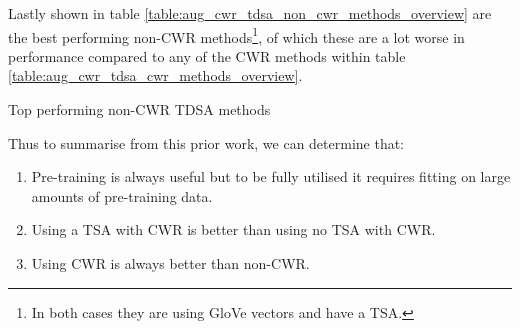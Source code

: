 Lastly shown in table \ref{table:aug_cwr_tdsa_non_cwr_methods_overview} are the best performing non-CWR methods\footnote{In both cases they are using GloVe vectors and have a TSA.}, of which these are a lot worse in performance compared to any of the CWR methods within table \ref{table:aug_cwr_tdsa_cwr_methods_overview}.

\begin{landscape}%
        
\end{landscape}

\begin{table}[!h]
    \centering
    
    \caption{Top performing non-CWR TDSA methods}
    \label{table:aug_cwr_tdsa_non_cwr_methods_overview}
\end{table}

Thus to summarise from this prior work, we can determine that:
\begin{enumerate}
    \item Pre-training is always useful but to be fully utilised it requires fitting on large amounts of pre-training data.
    \item Using a TSA with CWR is better than using no TSA with CWR.
    \item Using CWR is always better than non-CWR.
\end{enumerate}




